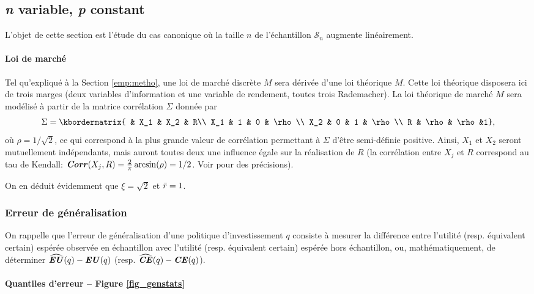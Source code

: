 \subsection{\textit{n} variable, \textit{p} constant}
\label{emp:nvar}

L'objet de cette section est l'étude du cas canonique où la taille $n$ de l'échantillon
$\mathcal{S}_n$ augmente linéairement.

\paragraph{Loi de marché}

Tel qu'expliqué à la Section \ref{emp:metho}, une loi de marché discrète $M$ sera dérivée
d'une loi théorique $M$. Cette loi théorique disposera ici de trois marges (deux variables
d'information et une variable de rendement, toutes trois Rademacher). La loi théorique de
marché $M$ sera modélisé à partir de la matrice corrélation $\Sigma$ donnée par
\begin{equation}
  \Sigma  =
  \kbordermatrix{
    & X_1 & X_2 & R\\
    X_1 & 1 & 0 & \rho\\
    X_2 & 0 & 1 & \rho\\
    R & \rho & \rho &1},
\end{equation}
où $\rho = 1/\sqrt{2}$, ce qui correspond à la plus grande valeur de corrélation permettant à
$\Sigma$ d'être semi-définie positive.  Ainsi, $X_1$ et $X_2$ seront mutuellement indépendants,
mais auront toutes deux une influence égale sur la réalisation de $R$ (la corrélation
entre $X_j$ et $R$ correspond au tau de Kendall: $\operatorname{\mbox{\textbf{\textit{Corr}}}}(X_j,R) =
\frac{2}{\pi}\arcsin(\rho) = 1/2$. Voir \cite{remillard2013statistical} pour des précisions).

On en déduit évidemment que $\xi = \sqrt{2}$ et $\bar r = 1$. 


\subsubsection{Erreur de généralisation}

On rappelle que l'erreur de généralisation d'une politique d'investissement $q$ consiste à
mesurer la différence entre l'utilité (resp. équivalent certain) espérée observée en
échantillon avec l'utilité (resp. équivalent certain) espérée hors échantillon, ou,
mathématiquement, de déterminer $\operatorname{\widehat{\operatorname{\mbox{\textbf{\textit{EU}}}}}}(q) - \operatorname{\mbox{\textbf{\textit{EU}}}}(q)$ (resp. $\operatorname{\widehat{\operatorname{\mbox{\textbf{\textit{CE}}}}}}(q) - \operatorname{\mbox{\textbf{\textit{CE}}}}(q)$).

\paragraph{Quantiles d'erreur -- Figure \ref{fig_genstats}}


